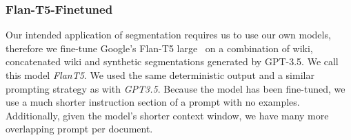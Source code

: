 \subsubsection{Flan-T5-Finetuned}\label{FlanT5}

Our intended application of segmentation requires us to use our own models, therefore we fine-tune Google's Flan-T5 large~\citep{FlanT5} on a combination of wiki, concatenated wiki and synthetic segmentations generated by GPT-3.5. We call this model \emph{FlanT5}. We used the same deterministic output and a similar prompting strategy as with \emph{GPT3.5}. Because the model has been fine-tuned, we use a much shorter instruction section of a prompt with no examples. Additionally, given the model's shorter context window, we have many more overlapping prompt per document. 